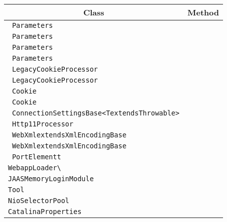 \begin{center}
\begin{tabular}{ll}\toprule
\multicolumn{1}{c}{Class}&\multicolumn{1}{c}{Method}\\\midrule
\lstinline/ Parameters/&\raisebox{0pt}{\lstinline/  lstinlineprocessParameters(byte[],int)/}\\ 
\lstinline/ Parameters/&\raisebox{0pt}{\lstinline/  lstinlineprocessParameters(byte[],int)/}\\ 
\lstinline/ Parameters/&\raisebox{0pt}{\lstinline/  lstinlineprocessParameters(byte[],int)/}\\ 
\lstinline/ Parameters/&\raisebox{0pt}{\lstinline/  lstinlineprocessParameters(byte[],int)/}\\ 
\lstinline/ LegacyCookieProcessor/&\raisebox{0pt}{\lstinline/  lstinlineprocessCookieHeader(byte[],int)/}\\ 
\lstinline/ LegacyCookieProcessor/&\raisebox{0pt}{\lstinline/  lstinlineprocessCookieHeader(byte[],int)/}\\ 
\lstinline/ Cookie/&\raisebox{0pt}{\lstinline/  lstinlinelogInvalidVersion(ByteBuffer)/}\\ 
\lstinline/ Cookie/&\raisebox{0pt}{\lstinline/  lstinlinelogInvalidVersion(ByteBuffer)/}\\ 
\lstinline/ ConnectionSettingsBase<TextendsThrowable>/&\raisebox{0pt}{\lstinline/  lstinlineset(Setting,long)/}\\ 
\lstinline/ Http11Processor/&\raisebox{0pt}{\lstinline/  lstinlinesslReHandShake()/}\\ 
\lstinline/ WebXmlextendsXmlEncodingBase/&\raisebox{0pt}{\lstinline/  orderWebFragments(WebXml)/}\\ 
\lstinline/ WebXmlextendsXmlEncodingBase/&\raisebox{0pt}{\lstinline/  orderWebFragments(WebXml)/}\\ 
\lstinline/ PortElementt/&\raisebox{0pt}{\lstinline/  lstinlinePortElement(String)/}\\ 
\lstinline/WebappLoader\/&\raisebox{0pt}{\lstinline/buildClassPath(String)/}\\ 
\lstinline/JAASMemoryLoginModule/&\raisebox{0pt}{\lstinline/load()/}\\ 
\lstinline/Tool/&\raisebox{0pt}{\lstinline/usage()/}\\ 
\lstinline/NioSelectorPool/&\raisebox{0pt}{\lstinline/getSharedSelector()/}\\ 
\lstinline/CatalinaProperties/&\raisebox{0pt}{\lstinline/loadProperties()/}\\ 

\end{tabular}
\end{center}
